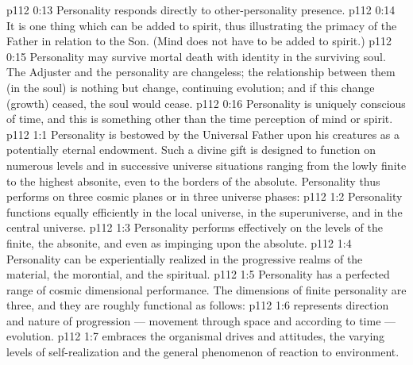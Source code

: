\vs p112 0:13 \pc {}\bibnobreakspace Personality responds directly to other\hyp{}personality presence.
\vs p112 0:14 \pc {}\bibnobreakspace It is one thing which can be added to spirit, thus illustrating the primacy of the Father in relation to the Son. (Mind does not have to be added to spirit.)
\vs p112 0:15 \pc {}\bibnobreakspace Personality may survive mortal death with identity in the surviving soul. The Adjuster and the personality are changeless; the relationship between them (in the soul) is nothing but change, continuing evolution; and if this change (growth) ceased, the soul would cease.
\vs p112 0:16 \pc {}\bibnobreakspace Personality is uniquely conscious of time, and this is something other than the time perception of mind or spirit.
\vs p112 1:1 Personality is bestowed by the Universal Father upon his creatures as a potentially eternal endowment. Such a divine gift is designed to function on numerous levels and in successive universe situations ranging from the lowly finite to the highest absonite, even to the borders of the absolute. Personality thus performs on three cosmic planes or in three universe phases:
\vs p112 1:2 \bibnobreakspace {} Personality functions equally efficiently in the local universe, in the superuniverse, and in the central universe.
\vs p112 1:3 \pc {}\bibnobreakspace {} Personality performs effectively on the levels of the finite, the absonite, and even as impinging upon the absolute.
\vs p112 1:4 \pc {}\bibnobreakspace {} Personality can be experientially realized in the progressive realms of the material, the morontial, and the spiritual.
\vs p112 1:5 \pc Personality has a perfected range of cosmic dimensional performance. The dimensions of finite personality are three, and they are roughly functional as follows:
\vs p112 1:6 \bibnobreakspace {} represents direction and nature of progression --- movement through space and according to time --- evolution.
\vs p112 1:7 \pc {}\bibnobreakspace {} embraces the organismal drives and attitudes, the varying levels of self\hyp{}realization and the general phenomenon of reaction to environment.
